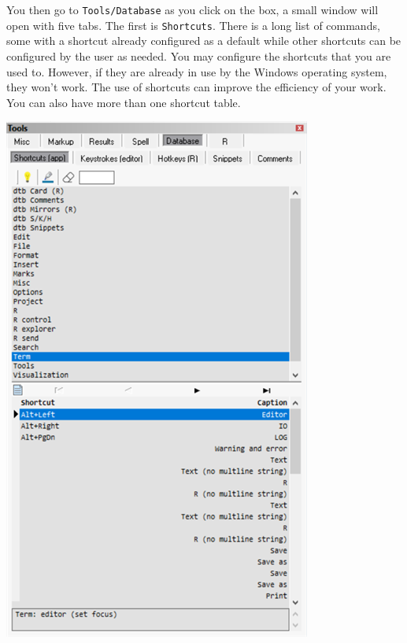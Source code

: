 You then go to \texttt{Tools/Database} as you click on the box, a small window will open with five tabs.
The first is \texttt{Shortcuts}. There is a long list of commands, some with a shortcut already configured
as a default while other shortcuts can be configured by the user as needed.
You may configure the shortcuts that you are used to. However,
if they are already in use by the Windows operating system, they won't work.
The use of shortcuts can improve the efficiency of your work. You can also have more than one shortcut table.

\includegraphics[scale=0.50]{./res/tools_database_shortcuts.png}~~
